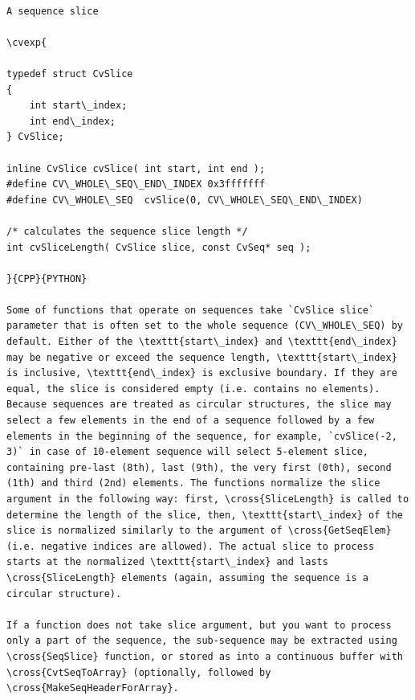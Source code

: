 \begin{verbatim}

A sequence slice

\cvexp{

typedef struct CvSlice
{
    int start\_index;
    int end\_index;
} CvSlice;

inline CvSlice cvSlice( int start, int end );
#define CV\_WHOLE\_SEQ\_END\_INDEX 0x3fffffff
#define CV\_WHOLE\_SEQ  cvSlice(0, CV\_WHOLE\_SEQ\_END\_INDEX)

/* calculates the sequence slice length */
int cvSliceLength( CvSlice slice, const CvSeq* seq );

}{CPP}{PYTHON}

Some of functions that operate on sequences take `CvSlice slice` parameter that is often set to the whole sequence (CV\_WHOLE\_SEQ) by default. Either of the \texttt{start\_index} and \texttt{end\_index} may be negative or exceed the sequence length, \texttt{start\_index} is inclusive, \texttt{end\_index} is exclusive boundary. If they are equal, the slice is considered empty (i.e. contains no elements). Because sequences are treated as circular structures, the slice may select a few elements in the end of a sequence followed by a few elements in the beginning of the sequence, for example, `cvSlice(-2, 3)` in case of 10-element sequence will select 5-element slice, containing pre-last (8th), last (9th), the very first (0th), second (1th) and third (2nd) elements. The functions normalize the slice argument in the following way: first, \cross{SliceLength} is called to determine the length of the slice, then, \texttt{start\_index} of the slice is normalized similarly to the argument of \cross{GetSeqElem} (i.e. negative indices are allowed). The actual slice to process starts at the normalized \texttt{start\_index} and lasts \cross{SliceLength} elements (again, assuming the sequence is a circular structure).

If a function does not take slice argument, but you want to process only a part of the sequence, the sub-sequence may be extracted using \cross{SeqSlice} function, or stored as into a continuous buffer with \cross{CvtSeqToArray} (optionally, followed by \cross{MakeSeqHeaderForArray}.


\end{verbatim}
\label{CreateSeq}
